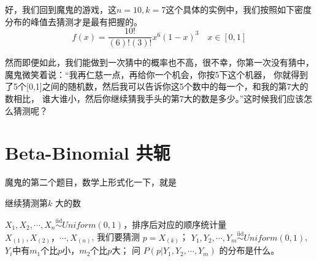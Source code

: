 好，我们回到魔鬼的游戏，这$n=10,k=7$这个具体的实例中，我们按照如下密度分布的峰值去猜测才是最有把握的。
$$ f(x) = \frac{10!}{(6)!(3)!}x^{6}(1-x)^{3} \quad x \in [0,1] $$

然而即便如此，我们能做到一次猜中的概率也不高，很不幸，你第一次没有猜中，
魔鬼微笑着说：“我再仁慈一点，再给你一个机会，你按5下这个机器，
你就得到了5个[0,1]之间的随机数，然后我可以告诉你这5个数中的每一个，和我的第7大的数相比，
谁大谁小，然后你继续猜我手头的第7大的数是多少。”这时候我们应该怎么猜测呢？

\section{Beta-Binomial 共轭}
魔鬼的第二个题目，数学上形式化一下，就是
\begin{algorithm}[htb]
\caption{继续猜测第$k$ 大的数}
\begin{algorithmic}[1]
\STATE $X_1,X_2,\cdots,X_n {\stackrel{\mathrm{iid}}{\sim}}Uniform(0,1)$，排序后对应的顺序统计量 $X_{(1)},X_{(2)}，\cdots, X_{(n)}$,  我们要猜测 $p=X_{(k)}$；
\STATE $Y_1,Y_2,\cdots,Y_m {\stackrel{\mathrm{iid}}{\sim}}Uniform(0,1)$, $Y_i$中有$m_1$个比$p$小，$m_2$个比$p$大；
\STATE 问 $P(p|Y_1,Y_2,\cdots,Y_m)$ 的分布是什么。
\end{algorithmic}
\end{algorithm}

